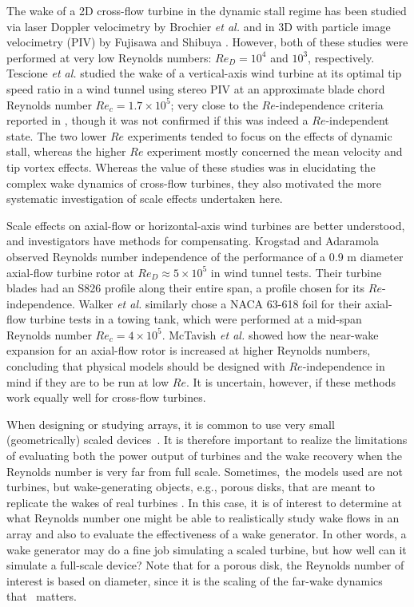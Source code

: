 The wake of a 2D cross-flow turbine in the dynamic stall regime has been studied
via laser Doppler velocimetry by Brochier \emph{et al.} \cite{Brochier1986} and
in 3D with particle image velocimetry (PIV) by Fujisawa and Shibuya
\cite{Fujisawa2001}. However, both of these studies were performed at very low
Reynolds numbers: $Re_D = 10^4$ and $10^3$, respectively. Tescione \emph{et al.}
\cite{Tescione2014} studied the wake of a vertical-axis wind turbine at its
optimal tip speed ratio in a wind tunnel using stereo PIV at an approximate
blade chord Reynolds number $Re_c = 1.7 \times 10^5$; very close to the
$Re$-independence criteria reported in \cite{Bachant2014}, though it was not
confirmed if this was indeed a $Re$-independent state. The two lower $Re$
experiments tended to focus on the effects of dynamic stall, whereas the higher
$Re$ experiment mostly concerned the mean velocity and tip vortex effects.
Whereas the value of these studies was in elucidating the complex wake dynamics
of cross-flow turbines, they also motivated the more systematic investigation of
scale effects undertaken here.

Scale effects on axial-flow or horizontal-axis wind turbines are better
understood, and investigators have methods for compensating. Krogstad and
Adaramola \cite{Krogstad2012a} observed Reynolds number independence of the
performance of a 0.9 m diameter axial-flow turbine rotor at $Re_D \approx 5
\times 10^5$ in wind tunnel tests. Their turbine blades had an S826 profile
along their entire span, a profile chosen for its $Re$-independence. Walker
\emph{et al.} \cite{Walker2014} similarly chose a NACA 63-618 foil for their
axial-flow turbine tests in a towing tank, which were performed at a mid-span
Reynolds number $Re_c = 4 \times 10^5$. McTavish \emph{et al.}
\cite{McTavish2013} showed how the near-wake expansion for an axial-flow rotor
is increased at higher Reynolds numbers, concluding that physical models should
be designed with $Re$-independence in mind if they are to be run at low $Re$. It
is uncertain, however, if these methods work equally well for cross-flow
turbines.

When designing or studying arrays, it is common to use very small
(geometrically) scaled \mbox{devices \cite{Chamorro2011, Chamorro2011b}}. It is
therefore important to realize the limitations of evaluating both the power
output of turbines and the wake recovery when the Reynolds number is very far
from full scale. Sometimes,~the models used are not turbines, but
wake-generating objects, e.g., porous disks, that are meant to replicate the
wakes of real turbines \cite{Goldenberg1983}. In this case, it is of interest to
determine at what Reynolds number one might be able to realistically study wake
flows in an array and also to evaluate the effectiveness of a wake generator. In
other words, a wake generator may do a fine job simulating a scaled turbine, but
how well can it simulate a full-scale device? Note that for a porous disk, the
Reynolds number of interest is based on diameter, since it is the scaling of the
far-wake dynamics that~ matters.

